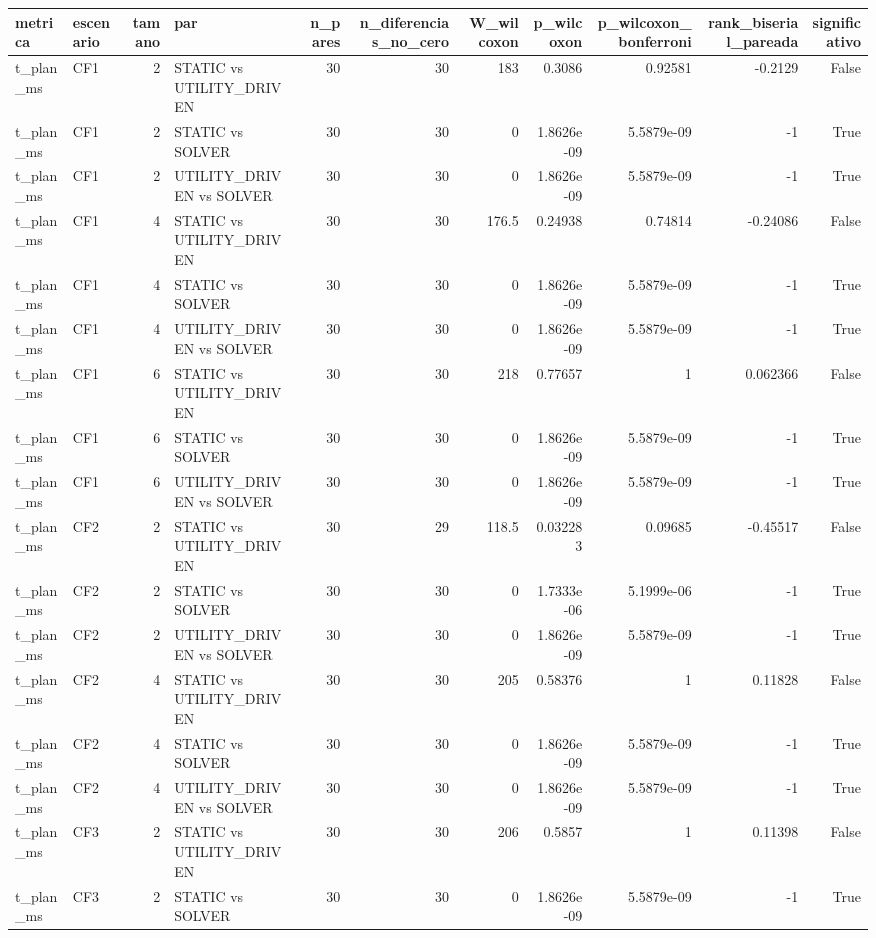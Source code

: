 \begin{tabular}{llrlrrrrrrr}
\toprule
metrica & escenario & tamano & par & n_pares & n_diferencias_no_cero & W_wilcoxon & p_wilcoxon & p_wilcoxon_bonferroni & rank_biserial_pareada & significativo \\
\midrule
t_plan_ms & CF1 & 2 & STATIC vs UTILITY_DRIVEN & 30 & 30 & 183 & 0.3086 & 0.92581 & -0.2129 & False \\
t_plan_ms & CF1 & 2 & STATIC vs SOLVER & 30 & 30 & 0 & 1.8626e-09 & 5.5879e-09 & -1 & True \\
t_plan_ms & CF1 & 2 & UTILITY_DRIVEN vs SOLVER & 30 & 30 & 0 & 1.8626e-09 & 5.5879e-09 & -1 & True \\
t_plan_ms & CF1 & 4 & STATIC vs UTILITY_DRIVEN & 30 & 30 & 176.5 & 0.24938 & 0.74814 & -0.24086 & False \\
t_plan_ms & CF1 & 4 & STATIC vs SOLVER & 30 & 30 & 0 & 1.8626e-09 & 5.5879e-09 & -1 & True \\
t_plan_ms & CF1 & 4 & UTILITY_DRIVEN vs SOLVER & 30 & 30 & 0 & 1.8626e-09 & 5.5879e-09 & -1 & True \\
t_plan_ms & CF1 & 6 & STATIC vs UTILITY_DRIVEN & 30 & 30 & 218 & 0.77657 & 1 & 0.062366 & False \\
t_plan_ms & CF1 & 6 & STATIC vs SOLVER & 30 & 30 & 0 & 1.8626e-09 & 5.5879e-09 & -1 & True \\
t_plan_ms & CF1 & 6 & UTILITY_DRIVEN vs SOLVER & 30 & 30 & 0 & 1.8626e-09 & 5.5879e-09 & -1 & True \\
t_plan_ms & CF2 & 2 & STATIC vs UTILITY_DRIVEN & 30 & 29 & 118.5 & 0.032283 & 0.09685 & -0.45517 & False \\
t_plan_ms & CF2 & 2 & STATIC vs SOLVER & 30 & 30 & 0 & 1.7333e-06 & 5.1999e-06 & -1 & True \\
t_plan_ms & CF2 & 2 & UTILITY_DRIVEN vs SOLVER & 30 & 30 & 0 & 1.8626e-09 & 5.5879e-09 & -1 & True \\
t_plan_ms & CF2 & 4 & STATIC vs UTILITY_DRIVEN & 30 & 30 & 205 & 0.58376 & 1 & 0.11828 & False \\
t_plan_ms & CF2 & 4 & STATIC vs SOLVER & 30 & 30 & 0 & 1.8626e-09 & 5.5879e-09 & -1 & True \\
t_plan_ms & CF2 & 4 & UTILITY_DRIVEN vs SOLVER & 30 & 30 & 0 & 1.8626e-09 & 5.5879e-09 & -1 & True \\
t_plan_ms & CF3 & 2 & STATIC vs UTILITY_DRIVEN & 30 & 30 & 206 & 0.5857 & 1 & 0.11398 & False \\
t_plan_ms & CF3 & 2 & STATIC vs SOLVER & 30 & 30 & 0 & 1.8626e-09 & 5.5879e-09 & -1 & True \\

\end{tabular}
